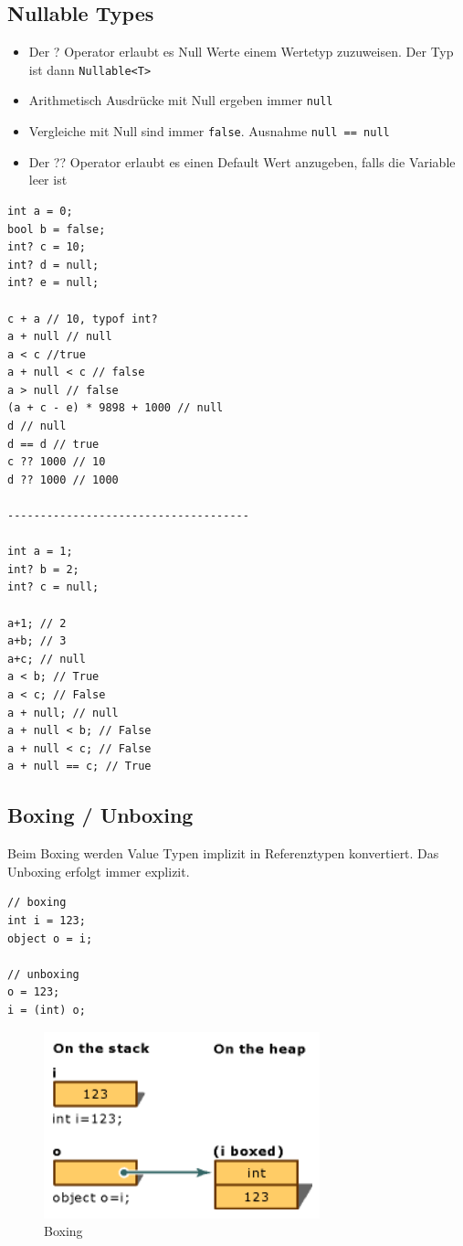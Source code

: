 \clearpage

\subsection{Nullable Types}
\begin{itemize}
	\item Der ? Operator erlaubt es Null Werte einem Wertetyp zuzuweisen. Der Typ ist dann \lstinline|Nullable<T>|
	\item Arithmetisch Ausdrücke mit Null ergeben immer \lstinline|null|
	\item Vergleiche mit Null sind immer \lstinline|false|. Ausnahme \lstinline|null == null|
	\item Der ?? Operator erlaubt es einen Default Wert anzugeben, falls die Variable leer ist
\end{itemize}
\begin{lstlisting}
int a = 0;
bool b = false;
int? c = 10;
int? d = null;
int? e = null;

c + a // 10, typof int?
a + null // null
a < c //true
a + null < c // false
a > null // false
(a + c - e) * 9898 + 1000 // null
d // null
d == d // true
c ?? 1000 // 10
d ?? 1000 // 1000

-------------------------------------

int a = 1;
int? b = 2;
int? c = null;

a+1; // 2
a+b; // 3
a+c; // null
a < b; // True
a < c; // False
a + null; // null
a + null < b; // False
a + null < c; // False
a + null == c; // True
\end{lstlisting}

\clearpage

\subsection{Boxing / Unboxing}
Beim Boxing werden Value Typen implizit in Referenztypen konvertiert. Das Unboxing erfolgt immer explizit. 
\begin{lstlisting}
// boxing
int i = 123;
object o = i;

// unboxing
o = 123;
i = (int) o;
\end{lstlisting}

\begin{figure}[h!]
\centering
\includegraphics[width=0.4\linewidth]{images/boxing}
\caption{Boxing}
\label{fig:boxing}
\end{figure}




